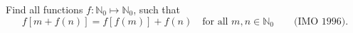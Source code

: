 Find all functions $f : \mathbb{N}_0 \mapsto \mathbb{N}_0$, such that
\[ f[m + f(n)] = f[f(m)] + f(n) \quad\text{for all } m, n \in \mathbb{N}_0 \qquad \text{(IMO 1996).} \]
